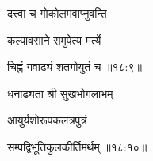 \nemslokab

{\devanagarifont दत्त्वा च गोकोलमवाप्नुवन्ति  \danda\dontdisplaylinenum }%
 
\nemslokac

{\devanagarifont कल्पावसाने समुपेत्य मर्त्ये }%
  \dontdisplaylinenum

\nemslokad

{\devanagarifont चिह्नं गवाढ्यं शतगोयुतं च {॥१८:९॥} \veg\dontdisplaylinenum }%

\ujvers{}
\nemslokab

{\devanagarifont धनाढ्यता श्री सुखभोगलाभम्  \danda\dontdisplaylinenum }%
 
\nemslokac

{\devanagarifont आयुर्यशोरूपकलत्रपुत्रं }%
  \dontdisplaylinenum

\nemslokad

{\devanagarifont सम्पद्विभूतिकुलकीर्तिमर्थम् {॥१८:१०॥} \veg\dontdisplaylinenum }%
 
\vers


\vers


\vers


\vers


\vers


\vers


\vers


\vers


\vers


\vers


\vers


\vers


\vers


\vers


\vers


\vers


\vers


\vers


\vers


\vers


\vers


\vers

\bekveg\szamveg
\vfill
\phpspagebreak

\thispagestyle{empty}

\fancyhead[LE]{}
\fancyhead[RE]{}
\fancyhead[LO]{}
\fancyhead[RO]{}
\szam\bek

